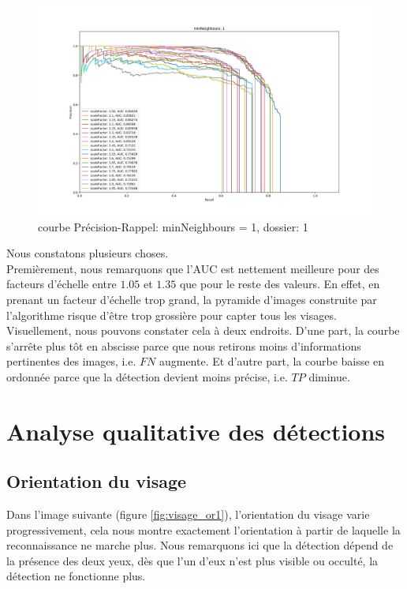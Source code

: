 \documentclass[a4paper,11pt]{article}
\begin{document}
    \label{results}
	\begin{figure}[H]
	    \begin{center}
		\includegraphics[scale = 0.4]{images/courbes/folder_01_minN_1.png}
		\caption{courbe Précision-Rappel: minNeighbours = 1, dossier: 1}
		\label{fig:minN_1}
	    \end{center}
	\end{figure}
        Nous constatons plusieurs choses.
        \\
        Premièrement, nous remarquons que l'AUC est nettement meilleure pour des facteurs d'échelle entre $1.05$ et $1.35$ que pour le reste des valeurs.
        En effet, en prenant un facteur d'échelle trop grand, la pyramide d'images construite par l'algorithme risque d'être trop grossière pour capter tous les visages.
        Visuellement, nous pouvons constater cela à deux endroits. 
        D'une part, la courbe s'arrête plus tôt en abscisse parce que nous retirons moins d'informations pertinentes des images, i.e. $FN$ augmente.
        Et d'autre part, la courbe baisse en ordonnée parce que la détection devient moins précise, i.e. $TP$ diminue.

\section{Analyse qualitative des détections}
    
    \subsection{Orientation du visage}
	
	Dans l'image suivante (figure \ref{fig:visage_or1}), l'orientation du visage varie
	progressivement, cela nous montre exactement l'orientation à partir de laquelle la
	reconnaissance ne marche plus. Nous remarquons ici que la détection dépend de la présence
	des deux yeux, dès que l'un d'eux n'est plus visible ou occulté, la détection ne fonctionne
	plus.
\end{document}
